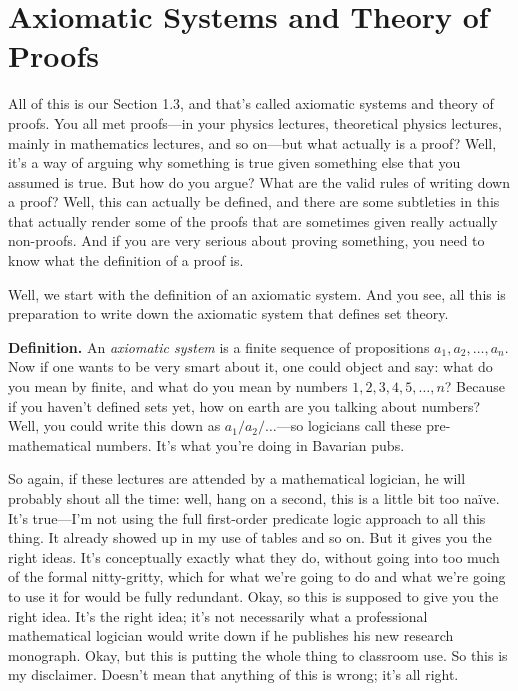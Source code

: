 \section{Axiomatic Systems and Theory of Proofs}

All of this is our Section 1.3, and that's called axiomatic systems and theory of proofs. You all met proofs---in your physics lectures, theoretical physics lectures, mainly in mathematics lectures, and so on---but what actually is a proof? Well, it's a way of arguing why something is true given something else that you assumed is true. But how do you argue? What are the valid rules of writing down a proof? Well, this can actually be defined, and there are some subtleties in this that actually render some of the proofs that are sometimes given really actually non-proofs. And if you are very serious about proving something, you need to know what the definition of a proof is.

Well, we start with the definition of an axiomatic system. And you see, all this is preparation to write down the axiomatic system that defines set theory.

\textbf{Definition.} An \emph{axiomatic system} is a finite sequence of propositions $a_1, a_2, \ldots, a_n$. Now if one wants to be very smart about it, one could object and say: what do you mean by finite, and what do you mean by numbers $1, 2, 3, 4, 5, \ldots, n$? Because if you haven't defined sets yet, how on earth are you talking about numbers? Well, you could write this down as $a_1 / a_2 / \ldots$---so logicians call these pre-mathematical numbers. It's what you're doing in Bavarian pubs.

So again, if these lectures are attended by a mathematical logician, he will probably shout all the time: well, hang on a second, this is a little bit too na\"ive. It's true---I'm not using the full first-order predicate logic approach to all this thing. It already showed up in my use of tables and so on. But it gives you the right ideas. It's conceptually exactly what they do, without going into too much of the formal nitty-gritty, which for what we're going to do and what we're going to use it for would be fully redundant. Okay, so this is supposed to give you the right idea. It's the right idea; it's not necessarily what a professional mathematical logician would write down if he publishes his new research monograph. Okay, but this is putting the whole thing to classroom use. So this is my disclaimer. Doesn't mean that anything of this is wrong; it's all right.

